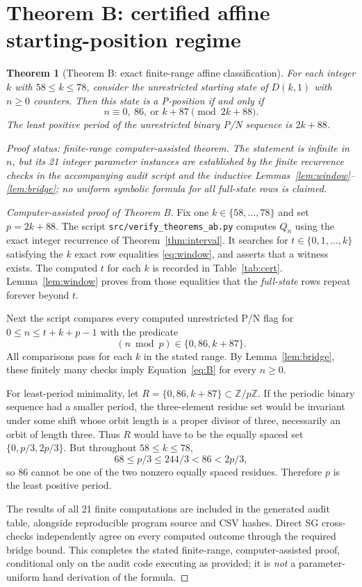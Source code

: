 \documentclass[11pt]{article}
\newtheorem{theorem}{Theorem}[section]
\begin{document}
\section{Theorem B: certified affine starting-position regime}
\begin{theorem}[Theorem B: exact finite-range affine classification]
\label{thm:B}
For each integer $k$ with $58\le k\le78$, consider the unrestricted
starting state of $D(k,1)$ with $n\ge0$ counters.  Then this state is a
P-position if and only if
\begin{equation}\label{eq:B}
\boxed{n\equiv0,\ 86,\ \text{or }k+87\pmod{2k+88}.}
\end{equation}
The least positive period of the unrestricted binary P/N sequence is
$2k+88$.

\emph{Proof status: finite-range computer-assisted theorem.}  The statement
is infinite in $n$, but its 21 integer parameter instances are established
by the finite recurrence checks in the accompanying audit script and the
inductive Lemmas~\ref{lem:window}--\ref{lem:bridge}; no uniform symbolic
formula for all full-state rows is claimed.
\end{theorem}

\begin{proof}[Computer-assisted proof of Theorem B]
Fix one $k\in\{58,\ldots,78\}$ and set $p=2k+88$.  The script
\texttt{src/verify\_theorems\_ab.py} computes $Q_n$ using the exact
integer recurrence of Theorem~\ref{thm:interval}.  It searches for
$t\in\{0,1,\ldots,k\}$ satisfying the $k$ exact row equalities
\eqref{eq:window}, and asserts that a witness exists.
The computed $t$ for each $k$ is recorded in
Table~\ref{tab:cert}.  Lemma~\ref{lem:window} proves from those equalities
that the \emph{full-state} rows repeat forever beyond $t$.

Next the script compares every computed unrestricted P/N flag for
$0\le n\le t+k+p-1$ with the predicate
\[
(n\bmod p)\in\{0,86,k+87\}.
\]
All comparisons pass for each $k$ in the stated range.  By
Lemma~\ref{lem:bridge}, these finitely many checks imply
Equation~\eqref{eq:B} for every $n\ge0$.

For least-period minimality, let $R=\{0,86,k+87\}\subset\mathbb Z/p\mathbb Z$.
If the periodic binary sequence had a smaller period, the
three-element residue set would be invariant under some shift whose
orbit length is a proper divisor of three, necessarily an orbit of
length three.  Thus $R$ would have to be the equally spaced set
$\{0,p/3,2p/3\}$.  But throughout $58\le k\le78$,
\[
68\le p/3\le244/3<86< 2p/3,
\]
so $86$ cannot be one of the two nonzero equally spaced residues.
Therefore $p$ is the least positive period.

The results of all 21 finite computations are included in the generated
audit table, alongside reproducible program source and CSV hashes.  Direct
SG cross-checks independently agree on every computed outcome through the
required bridge bound.  This completes the stated finite-range,
computer-assisted proof, conditional only on the audit code executing as
provided; it is \emph{not} a parameter-uniform hand derivation of the
formula.
\end{proof}
\end{document}
